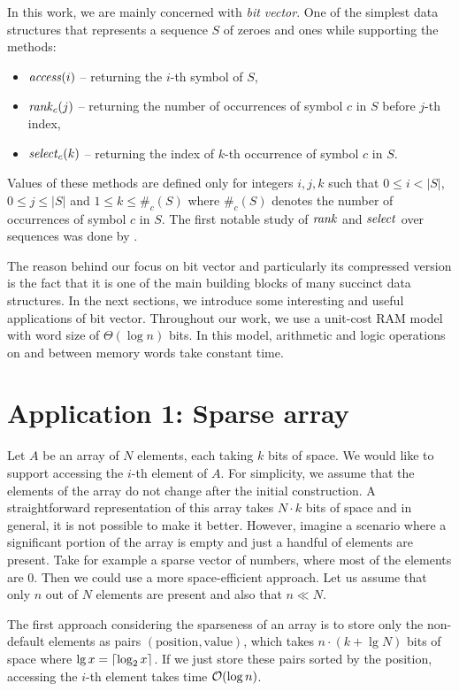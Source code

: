 In this work, we are mainly concerned with \textit{bit vector}. One of the simplest
data structures that represents a sequence $S$ of zeroes and ones while supporting the
methods:
\begin{itemize}
	\item $\mathit{access}(i)$ -- returning the $i$-th symbol of $S$,
	\item $\mathit{rank}_c(j)$ -- returning the number of occurrences of symbol $c$ in $S$ before $j$-th index,
	\item $\mathit{select}_c(k)$ -- returning the index of $k$-th occurrence of symbol $c$ in $S$.
\end{itemize}
Values of these methods are defined only for integers $i, j, k$ such that $0\leq i<|S|$, $0\leq j\leq |S|$
and $1\leq k\leq \#_c(S)$ where $\#_c(S)$ denotes the number of occurrences of symbol $c$ in $S$. The first
notable study of $\mathit{rank}$ and $\mathit{select}$ over sequences was done by \cite{jacobson1988succinct}.

The reason behind our focus on bit vector and particularly its compressed version
is the fact that it is one of the main building blocks of many succinct data structures.
In the next sections, we introduce some interesting and useful applications of bit vector.
Throughout our work, we use a unit-cost RAM model with word size of $\Theta(\log n)$ bits.
In this model, arithmetic and logic operations on and between memory words take constant time.

\section{Application 1: Sparse array}

Let $A$ be an array of $N$ elements, each taking $k$ bits of space. We would like
to support accessing the $i$-th element of $A$. For simplicity, we assume that
the elements of the array do not change after the initial construction. A straightforward
representation of this array takes $N\cdot k$ bits of space and in general, it is not
possible to make it better. However, imagine a scenario where a significant portion
of the array is empty and just a handful of elements are present. Take for example a
sparse vector of numbers, where most of the elements are 0. Then we could use a more
space-efficient approach. Let us assume that only $n$ out of $N$ elements are present
and also that $n\ll N$.

The first approach considering the sparseness of an array is to store only the non-default
elements as pairs $(\text{position}, \text{value})$, which takes $n\cdot (k+\lg N)$
bits of space where $\mathop{\mathrm{lg}} x = \left\lceil \log_2 x \right\rceil$. If we just store these pairs sorted by
the position, accessing the $i$-th element takes time $\mathcal{O}(\log n)$.

